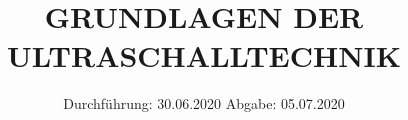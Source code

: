 

\subject{US1}
\title{GRUNDLAGEN DER ULTRASCHALLTECHNIK  }
\date{%
  Durchführung: 30.06.2020
  \hspace{3em}
  Abgabe: 05.07.2020
}



\maketitle
\thispagestyle{empty}
\tableofcontents
\newpage







\printbibliography{}


